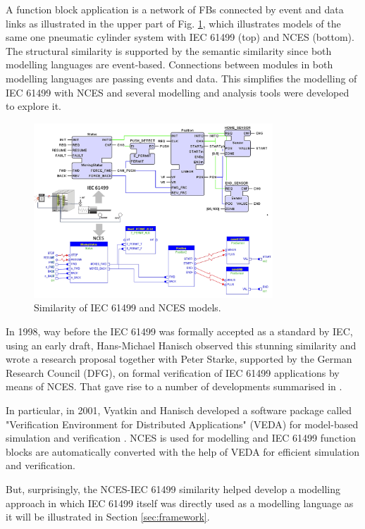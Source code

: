 \begin{bibunit}
A function block application is a network of FBs connected by event and data links as illustrated in the upper part of Fig. \ref{fig:similarity}, which illustrates models of the same one pneumatic cylinder system with IEC 61499 (top) and NCES (bottom). The structural similarity is supported by the semantic similarity since both modelling languages are event-based. Connections between modules in both modelling languages are passing events and data. 
This simplifies the modelling of IEC 61499 with NCES and several modelling and analysis tools were developed to explore it. 

\begin{figure}
    \centering
    \includegraphics[width=0.8\textwidth]{MX_Papers/Paper1/images/similarity.jpg}
    \caption{Similarity of IEC 61499 and NCES models.}
    \label{fig:similarity}
\end{figure}

In 1998, way before the IEC 61499 was formally accepted as a standard by IEC, using an early draft, Hans-Michael Hanisch observed this stunning similarity and wrote a research proposal together with Peter Starke, supported by the German Research Council (DFG), on formal verification of IEC 61499 applications by means of NCES. That gave rise to a number of developments summarised in \cite{hanisch2009one}.

In particular, in 2001, Vyatkin and Hanisch developed a software package called "Verification Environment for Distributed Applications" (VEDA) for model-based simulation and verification \cite{vyatkin2001formal}. NCES is used for modelling and IEC 61499 function blocks are automatically converted with the help of VEDA for efficient simulation and verification. 

But, surprisingly, the NCES-IEC 61499 similarity helped develop a modelling approach in which IEC 61499 itself was directly used as a modelling language as it will be illustrated in Section \ref{sec:framework}. 


\end{bibunit}
